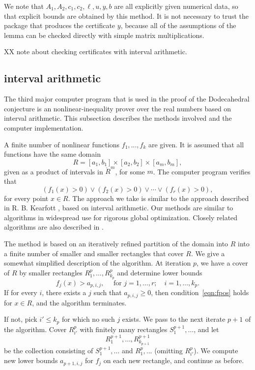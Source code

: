 We note that $A_1,A_2,c_1,c_2,\ell,u,y,b$ are all explicitly given
numerical data, so that explicit bounds are obtained by this
method.  It is not necessary to trust the package
that produces the certificate $y$, because
all of the assumptions of the lemma can be checked directly with
simple matrix multiplications.


XX note about checking certificates with interval arithmetic.

\subsection{interval arithmetic}

The third major computer program that is used in the proof of
the Dodecahedral conjecture is an nonlinear-inequality prover
over the real numbers based on interval arithmetic.  
This subsection describes the
methods involved and the computer implementation.

A finite number of nonlinear functions $f_1,\ldots,f_k$ are given.
It is assumed that all functions have the same domain
   $$R= [a_1,b_1] \times [a_2,b_2] \times [a_m,b_m],$$
given as a product of intervals in $\ring{R}^m$, for some $m$.
The computer program verifies that
  \begin{equation}\label{eqn:fpos}
  (f_1(x) >0) \lor (f_2(x) >0) \lor \cdots \lor (f_r(x) >0),
  \end{equation}
for every point $x\in R$.
The approach we take is similar to the approach described in
R. B. Kearfott \cite{Kea96}, based on interval arithmetic.
Our methods are similar to algorithms in widespread use for
rigorous global optimization.  Closely related algorithms
are also described in \cite{Zu}.

The method is based on an iteratively refined 
partition of the domain into $R$
into a finite number of smaller and smaller rectangles that cover $R$.
We give a somewhat simplified description of the algorithm.
At iteration $p$, we have a cover of $R$ by smaller rectangles
$R^p_1,\ldots,R^p_{k_p}$ and determine lower bounds
   $$
   f_j(x) > a_{p,i,j},\quad \text{ for } j=1,\ldots,r;\quad i=1,\ldots,k_p.
   $$
If for every $i$, there exists a $j$ such that $a_{p,i,j}\ge 0$,
then condition~\ref{eqn:fpos} holds for $x\in R$, and the algorithm
terminates.

If not, pick $i' \le k_p$ for which no such $j$ exists.  We
pass to the next iterate $p+1$ of the algorithm.  Cover $R^p_{i'}$
with finitely many rectangles $S^{p+1}_1,\ldots$, and let
  $$
  R^{p+1}_1,\ldots,R^{p+1}_{k_{p+1}}
  $$
be the collection consisting of $S^{p+1}_1,\ldots$ and $R^p_1,\ldots$
(omitting $R^p_{i'}$).  We compute new lower bounds $a_{p+1,i,j}$ 
for $f_j$ on each new rectangle, and continue as before.


